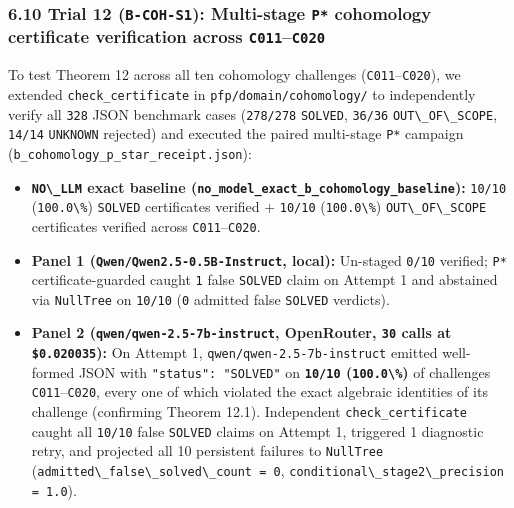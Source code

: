 \documentclass[
  11pt,
]{article}
\newcommand{\passthrough}[1]{#1}
\providecommand{\tightlist}{%
  \setlength{\itemsep}{0pt}\setlength{\parskip}{0pt}}
\begin{document}
\subsubsection{\texorpdfstring{6.10 Trial 12 (\texttt{B-COH-S1}):
Multi-stage \texttt{P*} cohomology certificate verification across
\texttt{C011}--\texttt{C020}}{6.10 Trial 12 (B-COH-S1): Multi-stage P* cohomology certificate verification across C011--C020}}\label{trial-12-b-coh-s1-multi-stage-p-cohomology-certificate-verification-across-c011c020}

To test Theorem 12 across all ten cohomology challenges
(\passthrough{\lstinline!C011!}--\passthrough{\lstinline!C020!}), we
extended \nolinkurl{check_certificate} in
\nolinkurl{pfp/domain/cohomology/} to independently verify
all \passthrough{\lstinline!328!} JSON benchmark cases
(\passthrough{\lstinline!278/278!} \passthrough{\lstinline!SOLVED!},
\passthrough{\lstinline!36/36!}
\passthrough{\lstinline!OUT\_OF\_SCOPE!},
\passthrough{\lstinline!14/14!} \passthrough{\lstinline!UNKNOWN!}
rejected) and executed the paired multi-stage
\passthrough{\lstinline!P*!} campaign
(\nolinkurl{b_cohomology_p_star_receipt.json}):

\begin{itemize}
\tightlist
\item
  \textbf{\passthrough{\lstinline!NO\_LLM!} exact baseline
  (\nolinkurl{no_model_exact_b_cohomology_baseline}):}
  \passthrough{\lstinline!10/10!} (\passthrough{\lstinline!100.0\%!})
  \passthrough{\lstinline!SOLVED!} certificates verified +
  \passthrough{\lstinline!10/10!} (\passthrough{\lstinline!100.0\%!})
  \passthrough{\lstinline!OUT\_OF\_SCOPE!} certificates verified across
  \passthrough{\lstinline!C011!}--\passthrough{\lstinline!C020!}.
\item
  \textbf{Panel 1 (\nolinkurl{Qwen/Qwen2.5-0.5B-Instruct}, local):}
  Un-staged \passthrough{\lstinline!0/10!} verified;
  \passthrough{\lstinline!P*!} certificate-guarded caught
  \passthrough{\lstinline!1!} false \passthrough{\lstinline!SOLVED!}
  claim on Attempt 1 and abstained via
  \passthrough{\lstinline!NullTree!} on \passthrough{\lstinline!10/10!}
  (\passthrough{\lstinline!0!} admitted false
  \passthrough{\lstinline!SOLVED!} verdicts).
\item
  \textbf{Panel 2 (\nolinkurl{qwen/qwen-2.5-7b-instruct}, OpenRouter,
  \passthrough{\lstinline!30!} calls at
  \passthrough{\lstinline!$0.020035!}):} On Attempt 1,
  \nolinkurl{qwen/qwen-2.5-7b-instruct} emitted well-formed JSON with
  \passthrough{\lstinline!"status": "SOLVED"!} on
  \textbf{\passthrough{\lstinline!10/10!}
  (\passthrough{\lstinline!100.0\%!})} of challenges
  \passthrough{\lstinline!C011!}--\passthrough{\lstinline!C020!}, every
  one of which violated the exact algebraic identities of its challenge
  (confirming Theorem 12.1). Independent \nolinkurl{check_certificate}
  caught all \passthrough{\lstinline!10/10!} false
  \passthrough{\lstinline!SOLVED!} claims on Attempt 1, triggered 1
  diagnostic retry, and projected all 10 persistent failures to
  \passthrough{\lstinline!NullTree!}
  (\passthrough{\lstinline!admitted\_false\_solved\_count = 0!},
  \passthrough{\lstinline!conditional\_stage2\_precision = 1.0!}).
\end{itemize}
\end{document}
